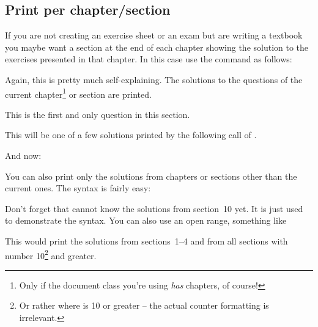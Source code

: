\documentclass[DIV10,toc=index,toc=bib,numbers=noendperiod]{cnpkgdoc}
\begin{document}
\subsection{Print per chapter/section}
If you are not creating an exercise sheet or an exam but are writing a
textbook you maybe want a section at the end of each chapter showing the
solution to the exercises presented in that chapter.  In this case use the
command as follows:
\begin{beispiel}
 \printsolutions[section]
 \printsolutions[chapter]
\end{beispiel}
Again, this is pretty much self-explaining.  The solutions to the questions of
the current chapter\footnote{Only if the document class you're using
  \emph{has} chapters, of course!} or section are printed.
\begin{beispiel}
 \begin{question}
  This is the first and only question in this section.
 \end{question}
 \begin{solution}
  This will be one of a few solutions printed by the following call of
  .
 \end{solution}
 And now:
 \printsolutions[section]
\end{beispiel}

\label{sssec:print_specific_section}
You can also print only the solutions from chapters or sections other than the
current ones.  The syntax is fairly easy:
\begin{beispiel}[below]
 \printsolutions[section={1-7,10}]
\end{beispiel}
Don't forget that  cannot know the solutions from
section~10 yet.  It is just used to demonstrate the syntax. You can also use
an open range, \eg something like
\begin{beispiel}
 \printsolutions[section={-4,10-}]
\end{beispiel}
This would print the solutions from sections~1--4 and from all sections with
number 10\footnote{Or rather where  is 10 or greater --
  the actual counter formatting is irrelevant.} and greater.
\end{document}
